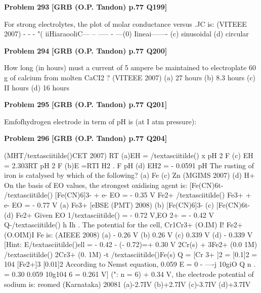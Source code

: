 \begin{problembox}
\textbf{Problem 293} \hfill \textbf{[GRB (O.P. Tandon) p.77 Q199]}
\label{q:ext-grb_all_questions-293}

For strong electrolytes, the plot of molar conductance versus 
.JC is: 
(VITEEE 2007) 
- - - "( iiHiaraooliC--- --
----- - ---(0) Iineai-------
(c) sinusoidal 
(d) circular
\end{problembox}

\begin{problembox}
\textbf{Problem 294} \hfill \textbf{[GRB (O.P. Tandon) p.77 Q200]}
\label{q:ext-grb_all_questions-294}

How long (in hours) must a current of 5 ampere be maintained 
to electroplate 60 g of calcium from molten CaCI2 ? 
(VITEEE 2007) 
(a) 27 hours 
(b) 8.3 hours (c) II hours 
(d) 16 hours
\end{problembox}

\begin{problembox}
\textbf{Problem 295} \hfill \textbf{[GRB (O.P. Tandon) p.77 Q201]}
\label{q:ext-grb_all_questions-295}

Emfofhydrogen electrode in term of pH is (at I atm pressure):
\end{problembox}

\begin{problembox}
\textbf{Problem 296} \hfill \textbf{[GRB (O.P. Tandon) p.77 Q204]}
\label{q:ext-grb_all_questions-296}

(MHT/textasciitilde()CET 2007) 
RT 
(a)EH = /textasciitilde() 
x pH 
2 
F 
(c) EH = 2.303RT pH 
2 
F 
(b)E 
=RT\underline{\hspace{1cm}}I 
H2 . 
F pH 
(d) EH2 = - 0.0591 pH 
The rusting of iron is catalysed by which of the following? 
(a) Fe 
(c) Zn 
(MGIMS 2007) 
(d) H+ 
On the basis of EO values, the strongest oxidising agent is: 
[Fe(CN)6t- /textasciitilde() 
[Fe(CN)6]3- + e-
EO = - 0.35 V 
Fe2+ /textasciitilde() 
Fe3+ + e-
EO = - 0.77 V 
(a) Fe3+ 
[eBSE (PMT) 2008) 
(b) [Fe(CN)6]3-
(c) [Fe(CN)6t-
(d) Fe2+ 
Given EO 1/textasciitilde() 
= - 0.72 V,EO 2+ 
= - 0.42 V 
Q-/textasciitilde() 
h 
Ih 
. 
The potential for the cell, Cr1Cr3+ (O.IM) I! Fe2+ (O.OIM)I Fe 
is: 
(AIEEE 2008) 
(a) - 0.26 V 
(b) 0.26 V 
(c) 0.339 V 
(d) - 0.339 V 
[Hint: E/textasciitilde()ell = - 0.42 - (- 0.72)=+ 0.30 V 
2Cr(s) + 3Fe2+ (0.0 1M) /textasciitilde() 
2Cr3+ (0. 1M) -t /textasciitilde()Fe(s) 
Q = [Cr
3+ ]2 = [0.1]2 = 104 
[Fe2+]3 
[0.01]2 
According to Nemst equation, 
0.059 
E =  0 - ----j 10giO Q 
n . 
= 0.30 \underline{\hspace{1cm}} 0.059 10g104 
6 
= 0.261 V] 
(": n = 6) 
+ 0.34 V, the electrode potential of sodium is: 
reomed (Karnataka) 20081 
(a)-2.7IV 
(b)+2.7IV (c)-3.7IV 
(d)+3.7IV
\end{problembox}

